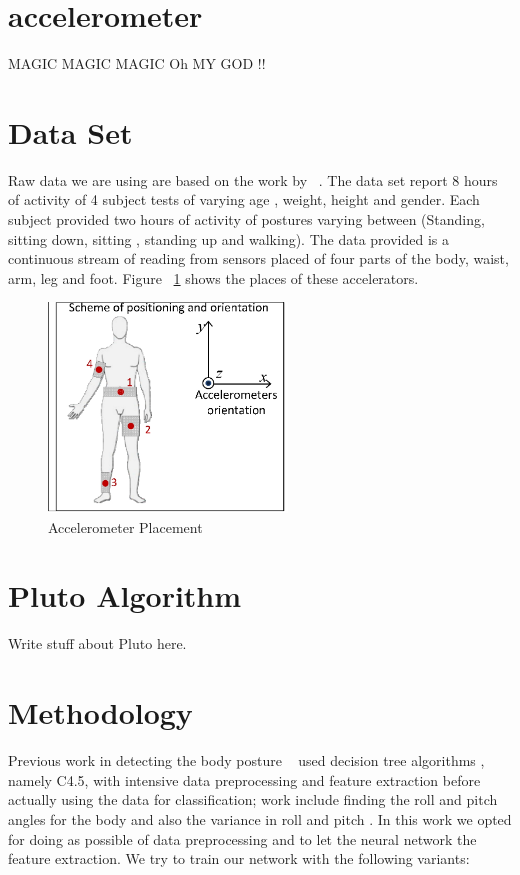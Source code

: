 \documentclass{article}
\begin{document}
\section{accelerometer}
\label{accelerometer} 
MAGIC MAGIC MAGIC Oh MY GOD !!

\section{Data Set}
\label{DataSet}

Raw data we are using are based on the work by ~\cite{ugulino2012wearable}. The data set report 8 hours of activity of 4 subject tests 
of varying age , weight, height and gender. Each subject provided two hours of activity of postures varying between (Standing,
sitting down, sitting , standing up and walking). The data provided is a continuous stream of reading from sensors placed of four 
parts of the body, waist, arm, leg and foot. Figure ~\ref{acc_placement} shows the places of these accelerators.   


\begin{figure}[h]
\centering
\includegraphics[width=2.5in]{acc_placement}
\caption{Accelerometer Placement}
\label{acc_placement}
\end{figure} 
 

\section{Pluto Algorithm}
\label{Pluto}
Write stuff about Pluto here.

\section{Methodology}
\label{meth}

Previous work in detecting the body posture ~\cite{ugulino2012wearable} used decision tree algorithms , namely C4.5,  with intensive 
data preprocessing and feature extraction before actually using the data for classification; work include finding the roll and 
pitch angles for the body and also the variance in roll and pitch . In this work we opted for doing as possible of data preprocessing
and to let the neural network the feature extraction. We try to train our network with the following variants:
\end{document}

